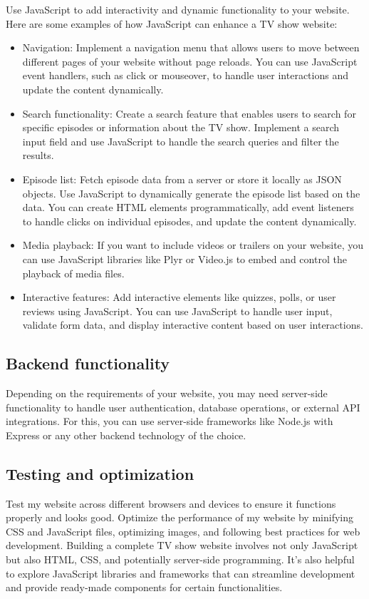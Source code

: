 \documentclass{article}
\begin{document}
Use JavaScript to add interactivity and dynamic functionality to your website. Here are some examples of how JavaScript can enhance a TV show website:
\begin{itemize}
\item 	Navigation: Implement a navigation menu that allows users to move between different pages of your website without page reloads. You can use JavaScript event handlers, such as click or mouseover, to handle user interactions and update the content dynamically.
\item	Search functionality: Create a search feature that enables users to search for specific episodes or information about the TV show. Implement a search input field and use JavaScript to handle the search queries and filter the results.
\item	Episode list: Fetch episode data from a server or store it locally as JSON objects. Use JavaScript to dynamically generate the episode list based on the data. You can create HTML elements programmatically, add event listeners to handle clicks on individual episodes, and update the content dynamically.
\item	Media playback: If you want to include videos or trailers on your website, you can use JavaScript libraries like Plyr or Video.js to embed and control the playback of media files.
\item	Interactive features: Add interactive elements like quizzes, polls, or user reviews using JavaScript. You can use JavaScript to handle user input, validate form data, and display interactive content based on user interactions.
\end{itemize}

\subsection{Backend functionality}

Depending on the requirements of your website, you may need server-side functionality to handle user authentication, database operations, or external API integrations. For this, you can use server-side frameworks like Node.js with Express or any other backend technology of the choice.

\subsection{Testing and optimization}

Test my website across different browsers and devices to ensure it functions properly and looks good. Optimize the performance of my website by minifying CSS and JavaScript files, optimizing images, and following best practices for web development. Building a complete TV show website involves not only JavaScript but also HTML, CSS, and potentially server-side programming. It's also helpful to explore JavaScript libraries and frameworks that can streamline development and provide ready-made components for certain functionalities.
\end{document}
